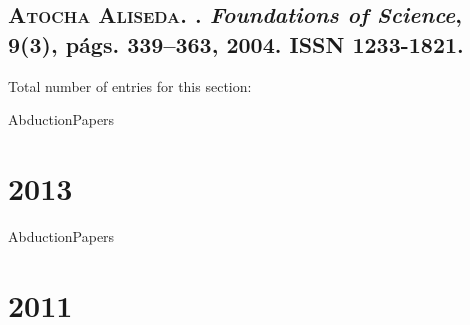 \subsection*{\textsc{Atocha Aliseda}.
\newblock {}.
\newblock \emph{Foundations of Science}, 9(3), p\'ags. 339--363, 2004.
\newblock ISSN 1233-1821.
}
Total number of entries for this section: 

\restartNumb

\begin{btUnit}
 \begin{btSect}{AbductionPapers}
  \section*{2013}
  \nocite{PauwelsMeyerCampenhout:DesignThinkingSupport}
  \nocite{TohmeCrespo:AbductionEconomics}
  \btPrintCited
 \end{btSect}
\end{btUnit}

\keepNumb

\begin{btUnit}
 \begin{btSect}{AbductionPapers}
 \section*{2011}
 \nocite{Ramirez:InfAbdModelos}
 \btPrintCited
 \end{btSect}
\end{btUnit}

